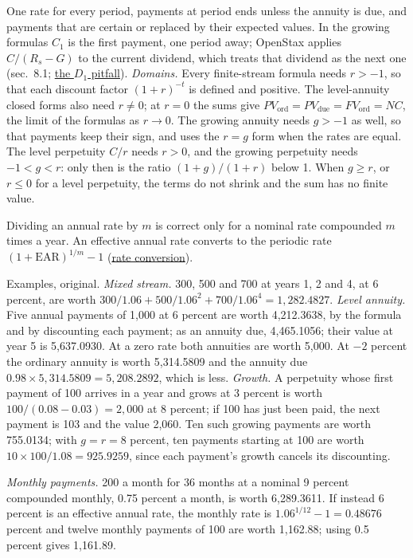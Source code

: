 \begin{qfmethod}
 One rate for every period, payments at period ends unless the annuity is due, and payments that are certain or replaced by their expected values. In the growing formulas $C_1$ is the first payment, one period away; OpenStax applies $C/(R_s-G)$ to the current dividend, which treats that dividend as the next one (sec.~8.1; \hyperref[meth:instrument-present-value]{the $D_1$ pitfall}). \emph{Domains.} Every finite-stream formula needs $r>-1$, so that each discount factor $(1+r)^{-t}$ is defined and positive. The level-annuity closed forms also need $r\neq0$; at $r=0$ the sums give $PV_{\mathrm{ord}}=PV_{\mathrm{due}}=FV_{\mathrm{ord}}=NC$, the limit of the formulas as $r\to0$. The growing annuity needs $g>-1$ as well, so that payments keep their sign, and uses the $r=g$ form when the rates are equal. The level perpetuity $C/r$ needs $r>0$, and the growing perpetuity needs $-1<g<r$: only then is the ratio $(1+g)/(1+r)$ below 1. When $g\ge r$, or $r\le0$ for a level perpetuity, the terms do not shrink and the sum has no finite value.

Dividing an annual rate by $m$ is correct only for a nominal rate compounded $m$ times a year. An effective annual rate converts to the periodic rate $(1+\mathrm{EAR})^{1/m}-1$ (\hyperref[def:time-value-compounding]{rate conversion}).

 Examples, original. \emph{Mixed stream.} 300, 500 and 700 at years 1, 2 and 4, at 6 percent, are worth $300/1.06+500/1.06^2+700/1.06^4=1{,}282.4827$. \emph{Level annuity.} Five annual payments of 1{,}000 at 6 percent are worth 4{,}212.3638, by the formula and by discounting each payment; as an annuity due, 4{,}465.1056; their value at year 5 is 5{,}637.0930. At a zero rate both annuities are worth 5{,}000. At $-2$ percent the ordinary annuity is worth 5{,}314.5809 and the annuity due $0.98\times5{,}314.5809=5{,}208.2892$, which is less. \emph{Growth.} A perpetuity whose first payment of 100 arrives in a year and grows at 3 percent is worth $100/(0.08-0.03)=2{,}000$ at 8 percent; if 100 has just been paid, the next payment is 103 and the value 2{,}060. Ten such growing payments are worth 755.0134; with $g=r=8$ percent, ten payments starting at 100 are worth $10\times100/1.08=925.9259$, since each payment's growth cancels its discounting.

\emph{Monthly payments.} 200 a month for 36 months at a nominal 9 percent compounded monthly, 0.75 percent a month, is worth 6{,}289.3611. If instead 6 percent is an effective annual rate, the monthly rate is $1.06^{1/12}-1=0.48676$ percent and twelve monthly payments of 100 are worth 1{,}162.88; using 0.5 percent gives 1{,}161.89.


\end{qfmethod}

